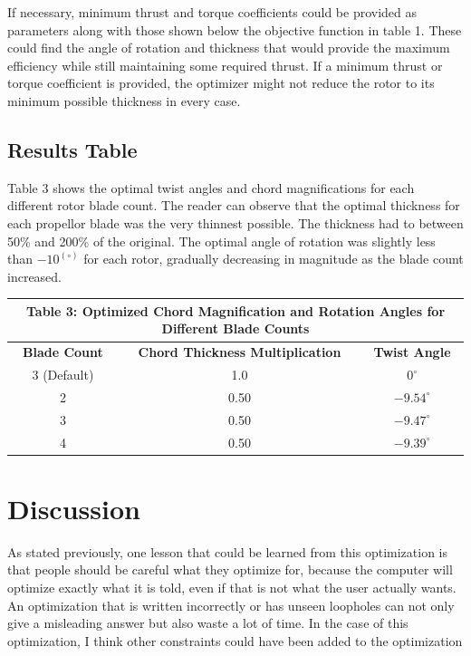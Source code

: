 \documentclass[journal ]{new-aiaa}
\begin{document}
If necessary, minimum thrust and torque coefficients could be provided as parameters along with those shown below the objective function in table 1. These could find the angle of rotation and thickness that would provide the maximum efficiency while still maintaining some required thrust. If a minimum thrust or torque coefficient is provided, the optimizer might not reduce the rotor to its minimum possible thickness in every case.

\subsection{Results Table}

Table 3 shows the optimal twist angles and chord magnifications for each different rotor blade count. The reader can observe that the optimal thickness for each propellor blade was the very thinnest possible. The thickness had to between 50\% and 200\% of the original. The optimal angle of rotation was slightly less than $-10^(\circ)$ for each rotor, gradually decreasing in magnitude as the blade count increased.

\begin{center}
\begin{tabular}{| c | c | c |}
	 \multicolumn{3}{c}{Table 3: Optimized Chord Magnification and Rotation Angles for Different Blade Counts}  \\ \hline
  	 \textbf{Blade Count} & \textbf{Chord Thickness Multiplication} & \textbf{Twist Angle} \\ \hline
  	 3 (Default) & 1.0 & $0^{\circ}$ \\ \hline
  	 2 & 0.50 & $-9.54^{\circ}$ \\ \hline
  	 3 & 0.50 & $-9.47^{\circ}$ \\ \hline
  	 4 & 0.50 & $-9.39^{\circ}$ \\ \hline
\end{tabular}
\end{center}


\section{Discussion}

As stated previously, one lesson that could be learned from this optimization is that people should be careful what they optimize for, because the computer will optimize exactly what it is told, even if that is not what the user actually wants. An optimization that is written incorrectly or has unseen loopholes can not only give a misleading answer but also waste a lot of time. In the case of this optimization, I think other constraints could have been added to the optimization
\end{document}
